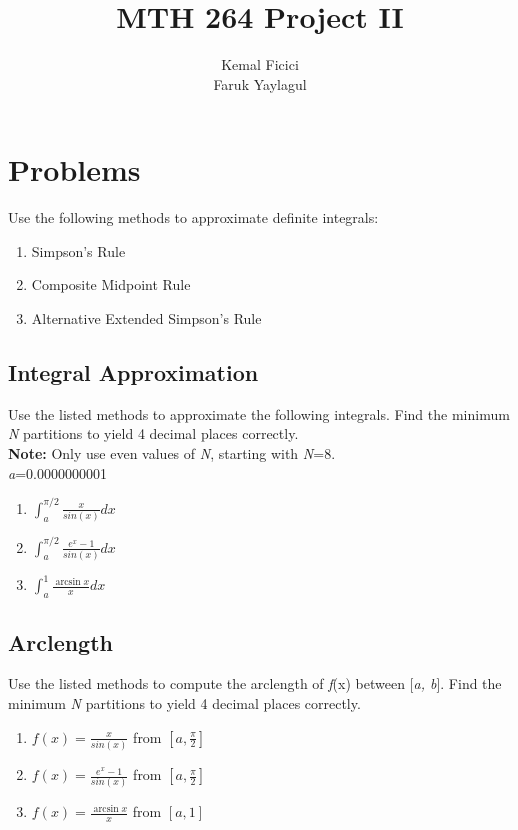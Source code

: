 \documentclass[a4paper12pt,titlepage]{article}
\title{\textbf{MTH 264 Project II}}
\author{Kemal Ficici\\Faruk Yaylagul}
\begin{document}
\maketitle

\clearpage


\section{Problems}

Use the following methods to approximate definite integrals:
    \begin{enumerate}
        \item Simpson's Rule
        \item Composite Midpoint Rule
        \item Alternative Extended Simpson's Rule
    \end{enumerate}
    
\subsection{Integral Approximation}
Use the listed methods to approximate the following integrals.
Find the minimum \textit{N} partitions to yield 4 decimal places correctly.
\\ \textbf{Note:} Only use even values of \textit{N}, starting with \textit{N}=8.
\\ \textit{a}=0.0000000001
\begin{enumerate}[label=(\alph*)]
\item {\Large $\int_{a}^{\pi /2} \frac{x}{sin(x)} dx$}
\item {\Large$\int_{a}^{\pi /2} \frac{e^{x} - 1}{sin(x)} dx$}
\item {\Large$\int_{a}^{1} \frac{\arcsin{x}}{x} dx$}
\end{enumerate}

\subsection{Arclength}
Use the listed methods to compute the arclength of \textit{f}(x) between [\textit{a, b}].  Find the minimum \textit{N} partitions to yield 4 decimal places correctly.
\begin{enumerate}[label=(\alph*)]
\item {\Large $f(x) = \frac{x}{sin(x)}$ from $[a, \frac{\pi}{2}]$}
\item {\Large $f(x) = \frac{e^{x} - 1}{sin(x)}$ from $[a, \frac{\pi}{2}]$}
\item {\Large $f(x) = \frac{\arcsin{x}}{x}$ from $[a, 1]$}
\end{enumerate}
\end{document}
